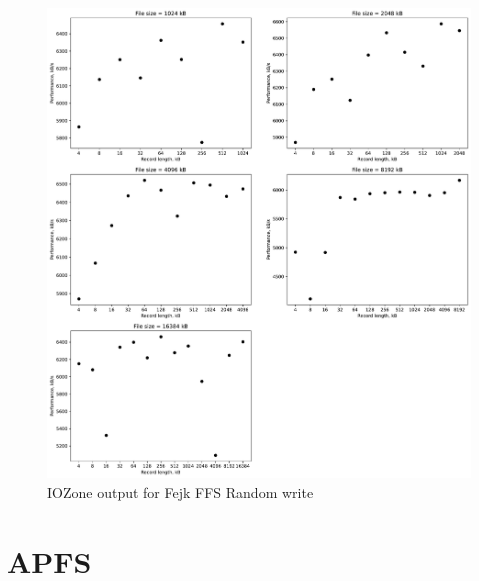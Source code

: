 \begin{figure}[!htb]
	\label{fig:app_bench_ffsf_rnd_write}
	\begin{center}
		\includegraphics[width=1.0\textwidth]{figures/benchmarking/fake-ffs/Random write.pdf}
	\end{center}
	\caption{IOZone output for Fejk \gls{FFS} Random write}
\end{figure}
\section{APFS}








